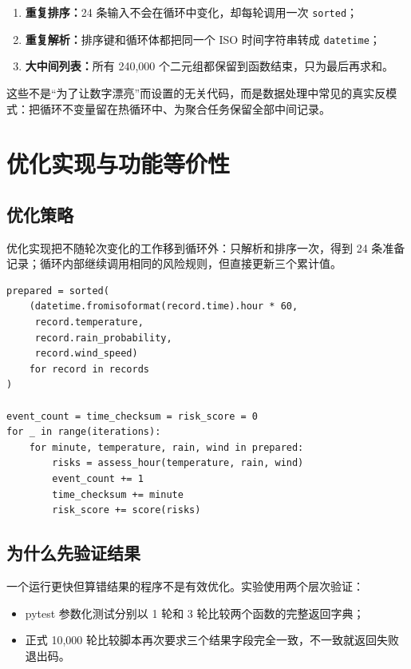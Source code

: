 \documentclass[UTF8,zihao=-4,a4paper]{ctexart}
\newcommand{\term}[1]{\textbf{#1}}
\newcommand{\code}[1]{\texttt{#1}}
\begin{document}
\begin{enumerate}
  \item \term{重复排序：}24 条输入不会在循环中变化，却每轮调用一次 \code{sorted}；
  \item \term{重复解析：}排序键和循环体都把同一个 ISO 时间字符串转成 \code{datetime}；
  \item \term{大中间列表：}所有 240,000 个二元组都保留到函数结束，只为最后再求和。
\end{enumerate}

这些不是“为了让数字漂亮”而设置的无关代码，而是数据处理中常见的真实反模式：把循环不变量留在热循环中、为聚合任务保留全部中间记录。

\section{优化实现与功能等价性}

\subsection{优化策略}

优化实现把不随轮次变化的工作移到循环外：只解析和排序一次，得到 24 条准备记录；循环内部继续调用相同的风险规则，但直接更新三个累计值。

\begin{lstlisting}[style=pythonstyle]
prepared = sorted(
    (datetime.fromisoformat(record.time).hour * 60,
     record.temperature,
     record.rain_probability,
     record.wind_speed)
    for record in records
)

event_count = time_checksum = risk_score = 0
for _ in range(iterations):
    for minute, temperature, rain, wind in prepared:
        risks = assess_hour(temperature, rain, wind)
        event_count += 1
        time_checksum += minute
        risk_score += score(risks)
\end{lstlisting}

\subsection{为什么先验证结果}

一个运行更快但算错结果的程序不是有效优化。实验使用两个层次验证：

\begin{itemize}
  \item pytest 参数化测试分别以 1 轮和 3 轮比较两个函数的完整返回字典；
  \item 正式 10,000 轮比较脚本再次要求三个结果字段完全一致，不一致就返回失败退出码。
\end{itemize}
\end{document}

